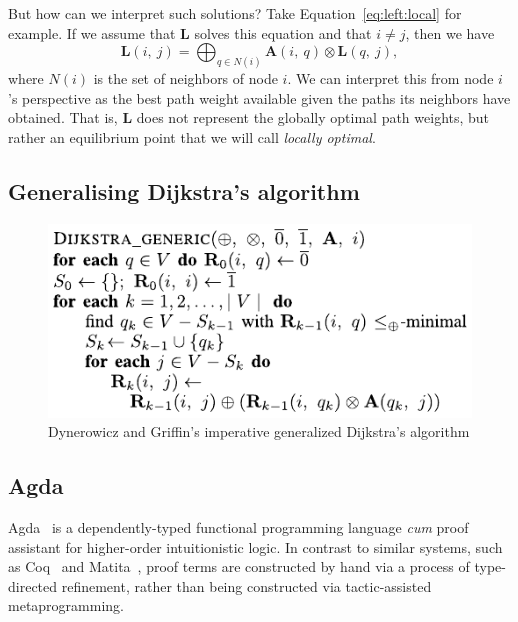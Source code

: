 But how can we interpret such solutions?
Take Equation~\ref{eq:left:local} for example.
If we assume that $\mathbf{L}$ solves this equation
and that $i \neq j$, then we have
\begin{equation}
\label{eq:left:local:at:i}
\mathbf{L}(i,\ j) = \displaystyle\bigoplus_{q \in N(i)} \mathbf{A}(i,\ q) \otimes \mathbf{L}(q,\ j),
\end{equation}
where $N(i)$ is the set of neighbors of node $i$.
We can interpret this from node $i$'s perspective as
the best path weight available given the paths its neighbors
have obtained.
That is, $\mathbf{L}$ does not represent the globally optimal
path weights, but rather an equilibrium point that we will
call \emph{locally optimal}.

\subsection{Generalising Dijkstra's algorithm}

\begin{figure}[ht]
\includegraphics{algorithm.pdf}
\caption{Dynerowicz and Griffin's imperative generalized Dijkstra's algorithm}
\label{fig.algorithm}
\end{figure}


\subsection{Agda}
\label{subsect.agda}

Agda~\cite{norell_dependently_2009} is a dependently-typed functional programming language \emph{cum} proof assistant for higher-order intuitionistic logic.
In contrast to similar systems, such as Coq~\cite{bertot_short_2008} and Matita~\cite{asperti_matita_2011}, proof terms are constructed by hand via a process of type-directed refinement, rather than being constructed via tactic-assisted metaprogramming.

